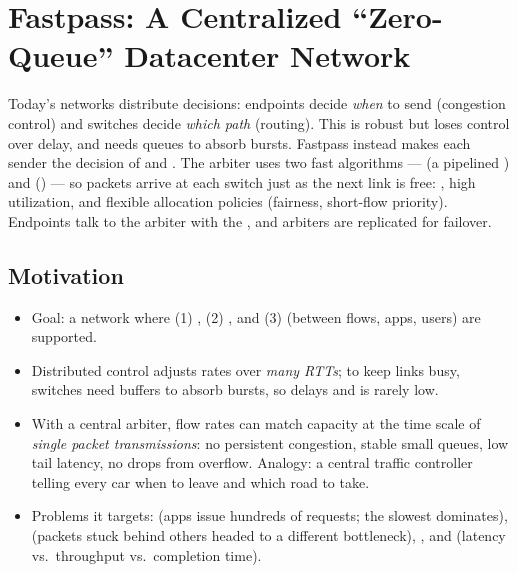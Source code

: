 \chapter{Fastpass: A Centralized ``Zero-Queue'' Datacenter Network}

\begin{keybox}
Today's networks distribute decisions: endpoints decide \emph{when} to send (congestion control) and switches decide \emph{which path} (routing). This is robust but loses control over delay, and needs queues to absorb bursts. Fastpass instead makes each sender  the decision of  and . The arbiter uses two fast algorithms ---  (a pipelined ) and  () --- so packets arrive at each switch just as the next link is free: , high utilization, and flexible allocation policies (fairness, short-flow priority). Endpoints talk to the arbiter with the , and arbiters are replicated for failover.
\end{keybox}

\section{Motivation}
\begin{itemize}
\item Goal: a network where (1) , (2) , and (3)  (between flows, apps, users) are supported.
\item Distributed control adjusts rates over \emph{many RTTs}; to keep links busy, switches need buffers to absorb bursts, so delays  and  is rarely low.
\item With a central arbiter, flow rates can match capacity at the time scale of \emph{single packet transmissions}: no persistent congestion, stable small queues, low tail latency, no drops from overflow. Analogy: a central traffic controller telling every car when to leave and which road to take.
\item Problems it targets:  (apps issue hundreds of requests; the slowest dominates),  (packets stuck behind others headed to a different bottleneck), , and  (latency vs.\ throughput vs.\ completion time).
\end{itemize}

